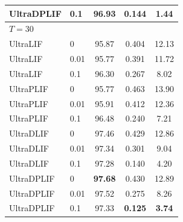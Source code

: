 \documentclass{article}
\theoremstyle{plain}
\theoremstyle{definition}
\theoremstyle{remark}
\begin{document}
\begin{table}[h]
\begin{center}
\begin{small}
\begin{tabular}{llccc}
UltraDPLIF & 0.1  & 96.93 & 0.144 & 1.44 \\
\midrule
\multicolumn{5}{l}{\textit{$T{=}30$}} \\
UltraLIF   & 0    & 95.87 & 0.404 & 12.13 \\
UltraLIF   & 0.01 & 95.77 & 0.391 & 11.72 \\
UltraLIF   & 0.1  & 96.30 & 0.267 & 8.02 \\
UltraPLIF  & 0    & 95.77 & 0.463 & 13.90 \\
UltraPLIF  & 0.01 & 95.91 & 0.412 & 12.36 \\
UltraPLIF  & 0.1  & 96.48 & 0.240 & 7.21 \\
UltraDLIF  & 0    & 97.46 & 0.429 & 12.86 \\
UltraDLIF  & 0.01 & 97.34 & 0.301 & 9.04 \\
UltraDLIF  & 0.1  & 97.28 & 0.140 & 4.20 \\
UltraDPLIF & 0    & \textbf{97.68} & 0.430 & 12.89 \\
UltraDPLIF & 0.01 & 97.52 & 0.275 & 8.26 \\
UltraDPLIF & 0.1  & 97.33 & \textbf{0.125} & \textbf{3.74} \\
\bottomrule
\end{tabular}
\end{small}
\end{center}
\vskip -0.1in
\end{table}
\end{document}
